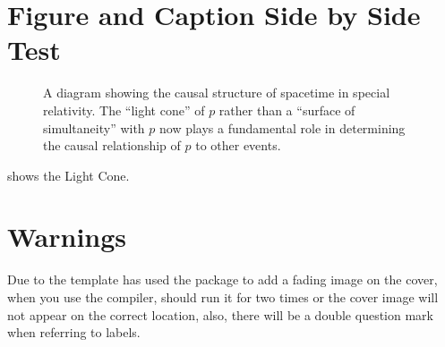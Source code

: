 \section{Figure and Caption Side by Side Test}
\begin{figure}[!ht]
\begin{minipage}{.32\textwidth}
    \caption{A diagram showing the causal structure of spacetime in special relativity. The ``light cone'' of $p$ rather than a ``surface of simultaneity'' with $p$ now plays a fundamental role in determining the causal relationship of $p$ to other events.}
    \label{1.1}
\end{minipage}
\hfill
\begin{minipage}{.64\textwidth}
    \centering
\end{minipage}
\end{figure}

 shows the Light Cone.

\section{Warnings}

Due to the template has used the  package to add a fading image on the cover, when you use the  compiler, should run it for two times or the cover image will not appear on the correct location, also, there will be a double question mark when referring to labels.


